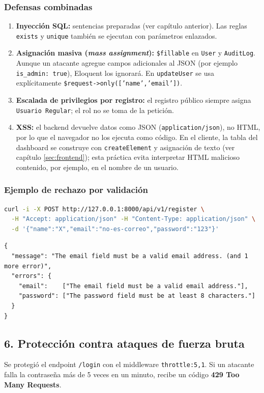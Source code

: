 \subsubsection{Defensas combinadas}
\begin{enumerate}
    \item \textbf{Inyección SQL:} sentencias preparadas (ver capítulo anterior). Las reglas \texttt{exists} y \texttt{unique} también se ejecutan con parámetros enlazados.
    \item \textbf{Asignación masiva (\textit{mass assignment}):} \texttt{\$fillable} en \texttt{User} y \texttt{AuditLog}. Aunque un atacante agregue campos adicionales al JSON (por ejemplo \texttt{is\_admin: true}), Eloquent los ignorará. En \texttt{updateUser} se usa explícitamente \texttt{\$request->only(['name','email'])}.
    \item \textbf{Escalada de privilegios por registro:} el registro público siempre asigna \texttt{Usuario Regular}; el rol no se toma de la petición.
    \item \textbf{XSS:} el backend devuelve datos como JSON (\texttt{application/json}), no HTML, por lo que el navegador no los ejecuta como código. En el cliente, la tabla del dashboard se construye con \texttt{createElement} y asignación de texto (ver capítulo \ref{sec:frontend}); esta práctica evita interpretar HTML malicioso contenido, por ejemplo, en el nombre de un usuario.
\end{enumerate}

\subsubsection{Ejemplo de rechazo por validación}
\begin{lstlisting}[language=bash]
curl -i -X POST http://127.0.0.1:8000/api/v1/register \
  -H "Accept: application/json" -H "Content-Type: application/json" \
  -d '{"name":"X","email":"no-es-correo","password":"123"}'
\end{lstlisting}
\begin{lstlisting}[language={}, caption={Respuesta 422}]
{
  "message": "The email field must be a valid email address. (and 1 more error)",
  "errors": {
    "email":    ["The email field must be a valid email address."],
    "password": ["The password field must be at least 8 characters."]
  }
}
\end{lstlisting}

\subsection{6. Protección contra ataques de fuerza bruta}
Se protegió el endpoint \texttt{/login} con el middleware \texttt{throttle:5,1}. Si un atacante falla la contraseña más de 5 veces en un minuto, recibe un código \textbf{429 Too Many Requests}.

